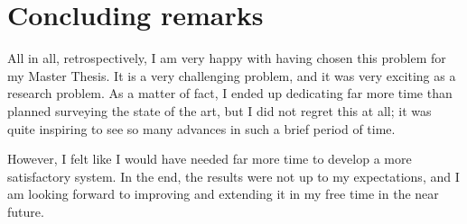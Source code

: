 \section{Concluding remarks}

All in all, retrospectively, I am very happy with having chosen this problem for my Master Thesis. It is a very challenging problem, and it was very exciting as a research problem. As a matter of fact, I ended up dedicating far more time than planned surveying the state of the art, but I did not regret this at all; it was quite inspiring to see so many advances in such a brief period of time.

However, I felt like I would have needed far more time to develop a more satisfactory system. In the end, the results were not up to my expectations, and I am looking forward to improving and extending it in my free time in the near future.
